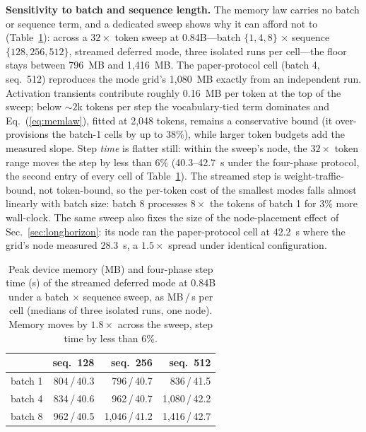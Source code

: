 \documentclass[journal]{IEEEtran}
\begin{document}
\textbf{Sensitivity to batch and sequence length.} The memory law carries
no batch or sequence term, and a dedicated sweep shows why it can afford
not to (Table~\ref{tab:sensitivity}): across a $32\times$ token sweep at
0.84B---batch $\{1,4,8\}$ $\times$ sequence $\{128,256,512\}$, streamed
deferred mode, three isolated runs per cell---the floor stays between 796~MB and 1{,}416~MB. The paper-protocol cell
(batch 4, seq.\ 512) reproduces the mode grid's 1{,}080~MB exactly from an
independent run. Activation transients contribute roughly 0.16~MB per
token at the top of the sweep; below ${\sim}2$k tokens per step the
vocabulary-tied term dominates and Eq.~(\ref{eq:memlaw}), fitted at
2{,}048 tokens, remains a conservative bound (it over-provisions the
batch-1 cells by up to 38\%), while larger token budgets add the
measured slope. Step
\emph{time} is flatter still: within the sweep's node, the $32\times$
token range moves the step by less than $6\%$ (40.3--42.7~s under the
four-phase protocol, the second entry of every cell of
Table~\ref{tab:sensitivity}). The streamed step is weight-traffic-bound, not
token-bound, so the per-token cost of the smallest modes falls almost
linearly with batch size: batch 8 processes $8\times$ the tokens of batch
1 for $3\%$ more wall-clock. The same sweep also fixes the size of the
node-placement effect of Sec.~\ref{sec:longhorizon}: its node ran the
paper-protocol cell at 42.2~s where the grid's node measured 28.3~s, a
$1.5\times$ spread under identical configuration.

\begin{table}[t]
\caption{Peak device memory (MB) and four-phase step time (s) of the streamed
deferred mode at 0.84B under a batch $\times$ sequence sweep, as
MB\,/\,s per cell (medians of three isolated runs, one node). Memory moves by
$1.8\times$ across the sweep, step time by less than 6\%.}
\label{tab:sensitivity}
\centering
\small
\begin{tabular}{@{}lrrr@{}}
\toprule
 & seq.\ 128 & seq.\ 256 & seq.\ 512 \\
\midrule
batch 1 & 804\,/\,40.3 & 796\,/\,40.7 & 836\,/\,41.5 \\
batch 4 & 834\,/\,40.6 & 962\,/\,40.7 & 1{,}080\,/\,42.2 \\
batch 8 & 962\,/\,40.5 & 1{,}046\,/\,41.2 & 1{,}416\,/\,42.7 \\
\bottomrule
\end{tabular}
\end{table}
\end{document}

